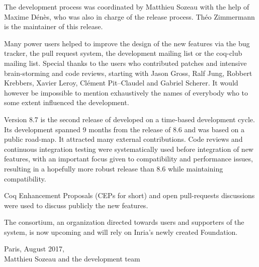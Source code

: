 The development process was coordinated by Matthieu Sozeau with the help
of Maxime Dénès, who was also in charge of the release process. Théo
Zimmermann is the maintainer of this release.

Many power users helped to improve the design of the new features via
the bug tracker, the pull request system, the {\Coq} development mailing
list or the coq-club mailing list. Special thanks to the users who
contributed patches and intensive brain-storming and code reviews,
starting with Jason Gross, Ralf Jung, Robbert Krebbers, Xavier Leroy,
Clément Pit--Claudel and Gabriel Scherer. It would however be impossible
to mention exhaustively the names of everybody who to some extent
influenced the development.

Version 8.7 is the second release of {\Coq} developed on a time-based
development cycle. Its development spanned 9 months from the release of
{\Coq} 8.6 and was based on a public road-map. It attracted many external
contributions. Code reviews and continuous integration testing were
systematically used before integration of new features, with an
important focus given to compatibility and performance issues, resulting
in a hopefully more robust release than {\Coq} 8.6 while maintaining
compatibility.

Coq Enhancement Proposals (CEPs for short) and open pull-requests
discussions were used to discuss publicly the new features.

The {\Coq} consortium, an organization directed towards users and
supporters of the system, is now upcoming and will rely on Inria's
newly created Foundation.

\begin{flushright}
Paris, August 2017,\\
Matthieu Sozeau and the {\Coq} development team\\
\end{flushright}







